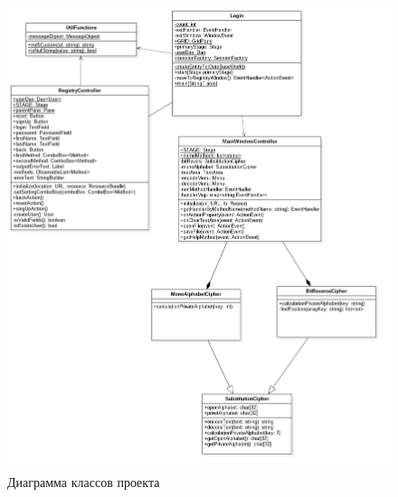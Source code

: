 \documentclass[a4paper,12pt]{article}
\begin{document}
\begin{center}
	\begin{figure}[h!]
		\centering
   		\includegraphics[scale=0.5]{img/class_diagram.png}
   		\caption{Диаграмма классов проекта}
   		\label{fig:class_diagram}
    \end{figure}
\end{center}
\end{document}
